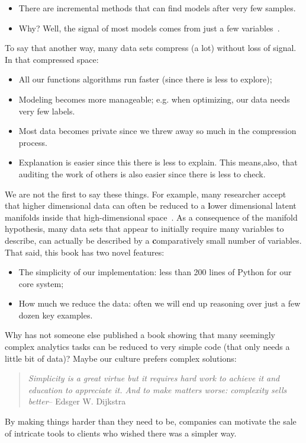 \documentclass[landscape,	DIV=calc,%
							paper=letter,%
							fontsize=10pt,%
							twocolumn]{scrartcl}	 					%
\begin{document}
\begin{itemize}
\item There are incremental methods that can find models after very few samples.
\item Why? Well, the signal of most models comes from just a few variables~\cite{MenziesOR07}.
\end{itemize}
To say that another way, many data sets compress (a  lot)
without loss of signal.
In that compressed space:
\begin{itemize}
    \item
        All our functions algorithms run faster (since there is less to explore);
    \item
        Modeling becomes more manageable;
e.g. when optimizing, our data needs very few labels.
\item
Most data becomes private
since we threw away so much in the compression process.
\item
Explanation is easier since this there is less to explain. 
This means,also, that auditing the work of others is also easier since there is less to check.
\end{itemize}
We are not the first to say these things.
For example, many researcher accept that higher dimensional data can often be reduced
to a
{\textbf lower dimensional latent manifolds} inside that high-dimensional
space~\cite{zhu2005semi}.
As a consequence of the manifold hypothesis, many data sets
that appear to initially require many variables to describe, can
actually be described by a {\textbf comparatively small number of variables}.
That said, this book has two novel features:
\begin{itemize}
    \item The simplicity of our implementation: less than 200 lines of Python for our core system;
    \item How much we reduce the data: often we will end up reasoning over just a few dozen key examples.
\end{itemize}
Why has not someone else published a  book showing that many seemingly complex
analytics tasks can be reduced to very simple code (that only needs a little bit of data)?
Maybe our culture prefers complex solutions:
\begin{quote}
    {\em 
Simplicity is a great virtue but it requires hard work to achieve
it and education to appreciate it. And to make matters worse:
    complexity sells better}\newline -- Edsger W. Dijkstra
\end{quote}
By making things harder than they need to be, companies can motivate
the sale  of intricate tools to clients who wished there was a
simpler way. 
\end{document}

